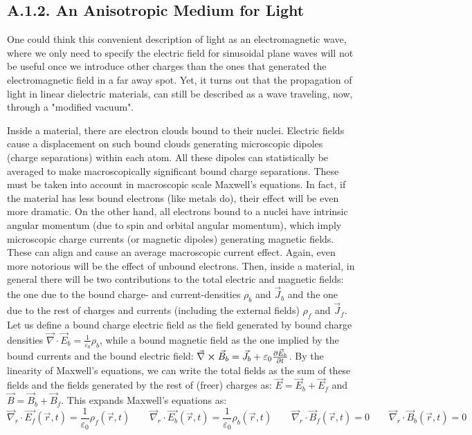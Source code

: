 \documentclass[11pt, a4paper, twoside]{article} %
\begin{document}
\subsection*{A.1.2. An Anisotropic Medium for Light\vspace{-0.2cm}}
One could think this convenient description of light as an electromagnetic wave, where we only need to specify the electric field for sinusoidal plane waves will not be useful once we introduce other charges than the ones that generated the electromagnetic field in a far away spot. Yet, it turns out that the propagation of light in linear dielectric materials, can still be described as a wave traveling, now, through a "modified vacuum". 

Inside a material, there are electron clouds bound to their nuclei. Electric fields cause a displacement on such bound clouds generating microscopic dipoles (charge separations) within each atom. All these dipoles can statistically be averaged to make macroscopically significant bound charge separations. These must be taken into account in macroscopic scale Maxwell's equations. In fact, if the material has less bound electrons (like metals do), their effect will be even more dramatic. On the other hand, all electrons bound to a nuclei have intrinsic angular momentum (due to spin and orbital angular momentum), which imply microscopic charge currents (or magnetic dipoles) generating magnetic fields. These can align and cause an average macroscopic current effect. Again, even more notorious will be the effect of unbound electrons. Then, inside a material, in general there will be two contributions to the total electric and magnetic fields: the one due to the bound charge- and current-densities $\rho_b$ and $\vec{J}_b$ and the one due to the rest of charges and currents (including the external fields) $\rho_f$ and $\vec{J}_f$. Let us define a bound charge electric field as the field generated by bound charge densities $\vec{\nabla}\cdot \vec{E}_b=\frac{1}{\varepsilon_0}\rho_b$, while a bound magnetic field as the one implied by the bound currents and the bound electric field: $\vec{\nabla}\cross \vec{B}_b=\vec{J}_b+\varepsilon_0\pdv{\vec{E}_b}{t}$. By the linearity of Maxwell's equations, we can write the total fields as the sum of these fields and the fields generated by the rest of (freer) charges as: $\vec{E}=\vec{E}_b+\vec{E}_f$ and $\vec{B}=\vec{B}_b+\vec{B}_f$. This expands Maxwell's equations as:
\begin{equation}\label{divBt}
\vec{\nabla}_r\cdot \vec{E_f}(\vec{r},t)=\frac{1}{\varepsilon_0}\rho_f(\vec{r},t) \quad  \quad\vec{\nabla}_r\cdot \vec{E_b}(\vec{r},t)=\frac{1}{\varepsilon_0}\rho_b(\vec{r},t) \quad \quad \vec{\nabla}_r\cdot \vec{B}_f(\vec{r},t)=0 \quad \quad \vec{\nabla}_r\cdot \vec{B}_b(\vec{r},t)=0 
\end{equation}
\end{document}
